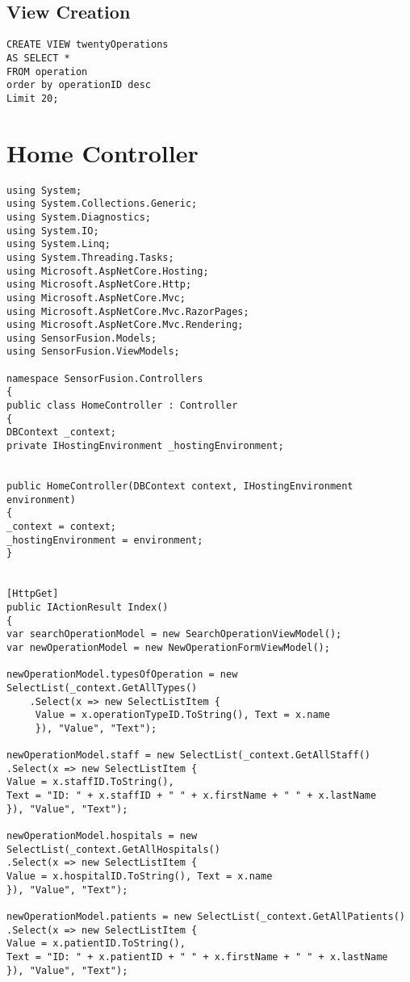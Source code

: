 \subsection{View Creation}
\begin{lstlisting}
CREATE VIEW twentyOperations
AS SELECT *
FROM operation
order by operationID desc
Limit 20;
\end{lstlisting}


\section{Home Controller}
\begin{lstlisting}
using System;
using System.Collections.Generic;
using System.Diagnostics;
using System.IO;
using System.Linq;
using System.Threading.Tasks;
using Microsoft.AspNetCore.Hosting;
using Microsoft.AspNetCore.Http;
using Microsoft.AspNetCore.Mvc;
using Microsoft.AspNetCore.Mvc.RazorPages;
using Microsoft.AspNetCore.Mvc.Rendering;
using SensorFusion.Models;
using SensorFusion.ViewModels;

namespace SensorFusion.Controllers
{
public class HomeController : Controller
{
DBContext _context;
private IHostingEnvironment _hostingEnvironment;


public HomeController(DBContext context, IHostingEnvironment environment)
{
_context = context;
_hostingEnvironment = environment;
}


[HttpGet]
public IActionResult Index()
{
var searchOperationModel = new SearchOperationViewModel();
var newOperationModel = new NewOperationFormViewModel();

newOperationModel.typesOfOperation = new SelectList(_context.GetAllTypes()
	.Select(x => new SelectListItem {
	 Value = x.operationTypeID.ToString(), Text = x.name 
	 }), "Value", "Text");

newOperationModel.staff = new SelectList(_context.GetAllStaff()
.Select(x => new SelectListItem {
Value = x.staffID.ToString(),
Text = "ID: " + x.staffID + " " + x.firstName + " " + x.lastName
}), "Value", "Text");

newOperationModel.hospitals = new SelectList(_context.GetAllHospitals()
.Select(x => new SelectListItem {
Value = x.hospitalID.ToString(), Text = x.name 
}), "Value", "Text");

newOperationModel.patients = new SelectList(_context.GetAllPatients()
.Select(x => new SelectListItem {
Value = x.patientID.ToString(),
Text = "ID: " + x.patientID + " " + x.firstName + " " + x.lastName
}), "Value", "Text");



\end{lstlisting}

